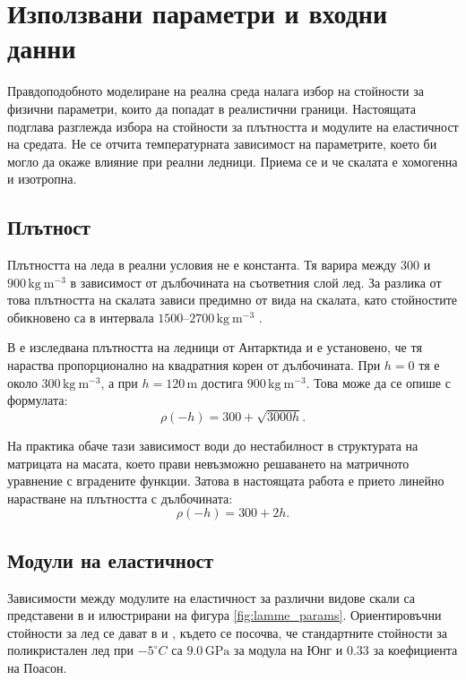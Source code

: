 \documentclass{report}
\begin{document}
	\section{Използвани параметри и входни данни}
	
	Правдоподобното моделиране на реална среда налага избор на стойности за физични параметри, които да попадат в реалистични граници. Настоящата подглава разглежда избора на стойности за плътността и модулите на еластичност на средата. Не се отчита температурната зависимост на параметрите, което би могло да окаже влияние при реални ледници. Приема се и че скалата е хомогенна и изотропна.
	
	\subsection*{Плътност}
	Плътността на леда в реални условия не е константа. Тя варира между $300$ и $900 \,\mathrm{kg~m^{-3}}$ в зависимост от дълбочината на съответния слой лед. За разлика от това плътността на скалата зависи предимно от вида на скалата, като стойностите обикновено са в интервала $1500$–$2700 \,\mathrm{kg~m^{-3}}$ \cite{lin2015rockdensity}.
	
	В \cite{ice_quadrature_decrease_with_depth} е изследвана плътността на ледници от Антарктида и е установено, че тя нараства пропорционално на квадратния корен от дълбочината. При $h=0$ тя е около $300 \,\mathrm{kg~m^{-3}}$, а при $h=120\,\mathrm{m}$ достига $900 \,\mathrm{kg~m^{-3}}$. Това може да се опише с формулата:
	\[
	\rho(-h) = 300 + \sqrt{3000h}.
	\]
	
	На практика обаче тази зависимост води до нестабилност в структурата на матрицата на масата, което прави невъзможно решаването на матричното уравнение с вградените функции. Затова в настоящата работа е прието линейно нарастване на плътността с дълбочината:
	\[
	\rho(-h) = 300 + 2h.
	\]
	
	\subsection*{Модули на еластичност}
	Зависимости между модулите на еластичност за различни видове скали са представени в \cite{lamme_params} и илюстрирани на фигура \ref{fig:lamme_params}. Ориентировъчни стойности за лед се дават в \cite{lamme_params_ice} и \cite{ice_physics_1974}, където се посочва, че стандартните стойности за поликристален лед при $-5^\circ C$ са $9.0 \,\mathrm{GPa}$ за модула на Юнг и $0.33$ за коефициента на Поасон.
	
\end{document}
